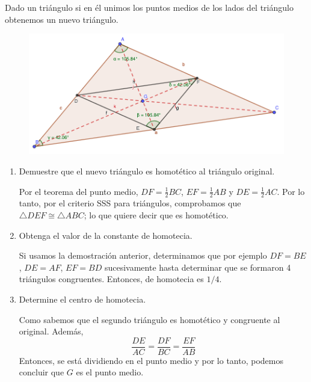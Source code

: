 





\begin{problema}
	Dado un triángulo si en él unimos los puntos medios de los lados del triángulo obtenemos un nuevo triángulo.
	\begin{figure}[H]
		\centering 
		\includegraphics[scale=0.3]{Images/1}
	\end{figure}
	\begin{enumerate}
		\item Demuestre que el nuevo triángulo es homotético al triángulo original. 
		\begin{dem}
			Por el teorema del punto medio, $DF=\frac{1}{2}BC$, $EF=\frac{1}{2}AB$ y $DE=\frac{1}{2}AC$. Por lo tanto, por el criterio SSS para triángulos, comprobamos que $\triangle DEF\cong \triangle ABC$; lo que quiere decir que es homotético. 
		\end{dem}
		\item Obtenga el valor de la constante de homotecia.
		\begin{sol}
			Si usamos la demostración anterior, determinamos que por ejemplo $DF=BE$,  $DE=AF$, $EF=BD$ sucesivamente hasta determinar que se formaron 4 triángulos congruentes. Entonces, de homotecia es $1/4$. 
		\end{sol}
		\item Determine el centro de homotecia.
		\begin{sol}
			Como sabemos que el segundo triángulo es homotético y congruente al original. Además, 
			$$\frac{DE}{AC}=\frac{DF}{BC}=\frac{EF}{AB}$$
			Entonces, se está dividiendo en el punto medio y por lo tanto, podemos concluir que $G$ es el punto medio. 
		\end{sol}
	\end{enumerate}
\end{problema}


